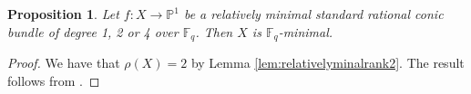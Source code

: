\documentclass[a4paper, 11pt, reqno]{amsart}
\numberwithin{equation}{section} \numberwithin{figure}{section}
\DeclareMathOperator{\Pic}{Pic}
\DeclareMathOperator{\Gal}{Gal}
\def \F {{\mathbb F}}
\def \P {{\mathbb P}}
\def \Z {{\mathbb Z}}
\newcommand{\ra}{\rightarrow}
\newtheorem{lemma}{Lemma}
\newtheorem{proposition}[lemma]{Proposition}
\theoremstyle{definition}
\numberwithin{lemma}{section}
\begin{document}

\begin{proposition}\label{prop:relativelyminimal-minimal}
    Let $f \colon X \ra \P^1$ be a relatively minimal standard rational conic bundle of degree 1, 2 or 4 over $\F_q$. Then $X$ is $\F_q$-minimal.
\end{proposition}

\begin{proof}
    We have that $\rho(X) = 2$ by Lemma \ref{lem:relativelyminalrank2}. The result follows from \cite[Theorem 4]{iskovskih}.
\end{proof}
\end{document}
